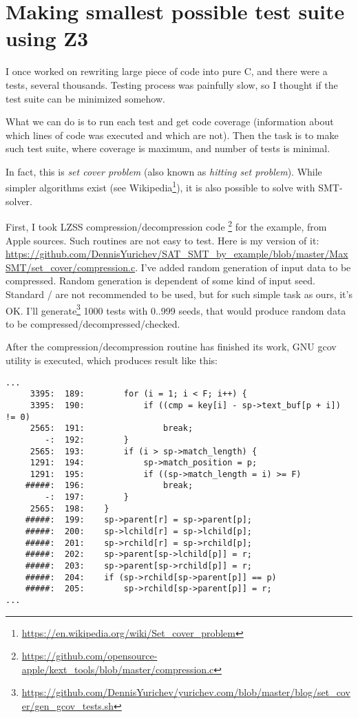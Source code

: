 \section{Making smallest possible test suite using Z3}
\label{set_cover}

I once worked on rewriting large piece of code into pure C, and there were a tests, several thousands.
Testing process was painfully slow, so I thought if the test suite can be minimized somehow.

What we can do is to run each test and get code coverage
(information about which lines of code was executed and which are not).
Then the task is to make such test suite, where coverage is maximum, and number of tests is minimal.

In fact, this is \textit{set cover problem} (also known as \textit{hitting set problem}).
While simpler algorithms exist (see Wikipedia\footnote{\url{https://en.wikipedia.org/wiki/Set_cover_problem}}),
it is also possible to solve with SMT-solver.

First, I took \ac{LZSS} compression/decompression code
\footnote{\url{https://github.com/opensource-apple/kext_tools/blob/master/compression.c}} for the example,
from Apple sources.
Such routines are not easy to test.
Here is my version of it:
\url{https://github.com/DennisYurichev/SAT_SMT_by_example/blob/master/MaxSMT/set_cover/compression.c}.
I've added random generation of input data to be compressed.
Random generation is dependent of some kind of input seed.
Standard / are not recommended to be used, but for such simple task as ours, it's OK.
I'll generate\footnote{\url{https://github.com/DennisYurichev/yurichev.com/blob/master/blog/set_cover/gen_gcov_tests.sh}}
1000 tests with 0..999 seeds, that would produce random data to be compressed/decompressed/checked.

After the compression/decompression routine has finished its work,
GNU gcov utility is executed, which produces result like this:

\begin{lstlisting}
...
     3395:  189:        for (i = 1; i < F; i++) {
     3395:  190:            if ((cmp = key[i] - sp->text_buf[p + i]) != 0)
     2565:  191:                break;
        -:  192:        }
     2565:  193:        if (i > sp->match_length) {
     1291:  194:            sp->match_position = p;
     1291:  195:            if ((sp->match_length = i) >= F)
    #####:  196:                break;
        -:  197:        }
     2565:  198:    }
    #####:  199:    sp->parent[r] = sp->parent[p];
    #####:  200:    sp->lchild[r] = sp->lchild[p];
    #####:  201:    sp->rchild[r] = sp->rchild[p];
    #####:  202:    sp->parent[sp->lchild[p]] = r;
    #####:  203:    sp->parent[sp->rchild[p]] = r;
    #####:  204:    if (sp->rchild[sp->parent[p]] == p)
    #####:  205:        sp->rchild[sp->parent[p]] = r;
...
\end{lstlisting}

